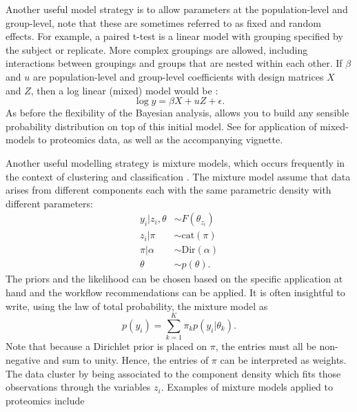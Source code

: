\documentclass[12pt,english, journal=jpr, layout=twocolumn]{article}
\begin{document}
Another useful model strategy is to allow parameters at the population-level and group-level, note that these are sometimes referred to as fixed and random effects. For example, a paired t-test is a linear model with grouping specified by the subject or replicate. More complex groupings are allowed, including interactions between groupings and groups that are nested within each other. If $\beta$ and $u$ are population-level and group-level coefficients with design matrices $X$ and $Z$, then a log linear (mixed) model would be \citep{Bates::2014}:
\begin{equation}
\log y = \beta X + u Z + \epsilon.
\end{equation}
As before the flexibility of the Bayesian analysis, allows you to build any sensible probability distribution on top of this initial model. See \citet{Morris::2008, Morris::2011} for application of mixed-models to proteomics data, as well as the accompanying vignette.

Another useful modelling strategy is mixture models, which occurs frequently in the context of clustering and classification \citep{Mclachlan::2019}. The mixture model assume that data arises from different components each with the same parametric density with different parameters:
\begin{equation}
\begin{split}
y_i|z_i,\theta &\sim F(\theta_{z_i})\\
z_i|\pi & \sim \text{cat}(\pi)\\
\pi|\alpha & \sim \text{Dir}(\alpha)\\
\theta & \sim p(\theta).
\end{split}	
\end{equation}
The priors and the likelihood can be chosen based on the specific application at hand and the workflow recommendations can be applied. It is often insightful to write, using the law of total probability, the mixture model as
\begin{equation}
p(y_i) = \sum_{k = 1}^{K} \pi_k p(y_i|\theta_k).
\end{equation}  
Note that because a Dirichlet prior is placed on $\pi$, the entries must all be non-negative and sum to unity. Hence, the entries of $\pi$ can be interpreted as weights. The data cluster by being associated to the component density which fits those observations through the variables $z_i$. Examples of mixture models applied to proteomics include \citet{Chung::2013, Crook::2018, Crook::2019b}
\end{document}
